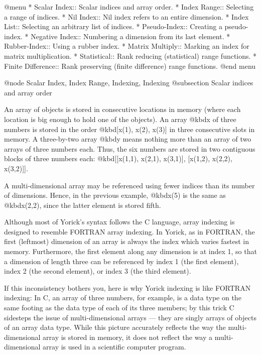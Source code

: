 @menu
* Scalar Index::                Scalar indices and array order.
* Index Range::                 Selecting a range of indices.
* Nil Index::                   Nil index refers to an entire dimension.
* Index List::                  Selecting an arbitrary list of indices.
* Pseudo-Index::                Creating a pseudo-index.
* Negative Index::              Numbering a dimension from its last element.
* Rubber-Index::                Using a rubber index.
* Matrix Multiply::             Marking an index for matrix multiplication.
* Statistical::                 Rank reducing (statistical) range functions.
* Finite Difference::           Rank preserving (finite difference) range functions.
@end menu

@node    Scalar Index, Index Range, Indexing, Indexing
@subsection Scalar indices and array order

An array of objects is stored in consecutive locations in memory (where
each location is big enough to hold one of the objects).  An array
@kbd{x} of three numbers is stored in the order @kbd{[x(1), x(2), x(3)]}
in three consecutive slots in memory.  A three-by-two array @kbd{y}
means nothing more than an array of two arrays of three numbers each.
Thus, the six numbers are stored in two contiguous blocks of three
numbers each: @kbd{[[x(1,1), x(2,1), x(3,1)], [x(1,2), x(2,2),
x(3,2)]]}.

A multi-dimensional array may be referenced using fewer indices than its
number of dimensions.  Hence, in the previous example, @kbd{x(5)} is the
same as @kbd{x(2,2)}, since the latter element is stored fifth.

Although most of Yorick's syntax follows the C language, array indexing
is designed to resemble FORTRAN array indexing.  In Yorick, as in
FORTRAN, the first (leftmost) dimension of an array is always the index
which varies fastest in memory.  Furthermore, the first element along
any dimension is at index 1, so that a dimension of length three can be
referenced by index 1 (the first element), index 2 (the second element),
or index 3 (the third element).

If this inconsistency bothers you, here is why Yorick indexing is like
FORTRAN indexing: In C, an array of three numbers, for example, is a
data type on the same footing as the data type of each of its three
members; by this trick C sidesteps the issue of multi-dimensional arrays
--- they are singly arrays of objects of an array data type.  While this
picture accurately reflects the way the multi-dimensional array is
stored in memory, it does not reflect the way a multi-dimensional array
is used in a scientific computer program.


